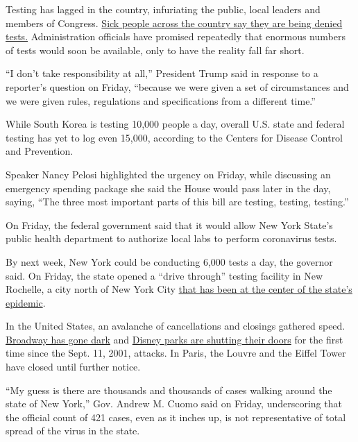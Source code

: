 Testing has lagged in the country, infuriating the public, local leaders
and members of Congress.
\href{https://www.nytimes3xbfgragh.onion/2020/03/12/us/coronavirus-testing-challenges.html}{Sick
people across the country say they are being denied tests.}
Administration officials have promised repeatedly that enormous numbers
of tests would soon be available, only to have the reality fall far
short.

``I don't take responsibility at all,'' President Trump said in response
to a reporter's question on Friday, ``because we were given a set of
circumstances and we were given rules, regulations and specifications
from a different time.''

While South Korea is testing 10,000 people a day, overall U.S. state and
federal testing has yet to log even 15,000, according to the Centers for
Disease Control and Prevention.

Speaker Nancy Pelosi highlighted the urgency on Friday, while discussing
an emergency spending package she said the House would pass later in the
day, saying, ``The three most important parts of this bill are testing,
testing, testing.''

On Friday, the federal government said that it would allow New York
State's public health department to authorize local labs to perform
coronavirus tests.

By next week, New York could be conducting 6,000 tests a day, the
governor said. On Friday, the state opened a ``drive through'' testing
facility in New Rochelle, a city north of New York City
\href{https://www.nytimes3xbfgragh.onion/2020/03/12/nyregion/coronavirus-new-rochelle-containment.html}{that
has been at the center of the state's epidemic}.

In the United States, an avalanche of cancellations and closings
gathered speed.
\href{https://www.nytimes3xbfgragh.onion/2020/03/12/theater/coronavirus-broadway-shutdown.html}{Broadway
has gone dark} and
\href{https://www.nytimes3xbfgragh.onion/2020/03/12/business/disneyland-coronavirus.html}{Disney
parks are shutting their doors} for the first time since the Sept. 11,
2001, attacks. In Paris, the Louvre and the Eiffel Tower have closed
until further notice.

``My guess is there are thousands and thousands of cases walking around
the state of New York,'' Gov. Andrew M. Cuomo said on Friday,
underscoring that the official count of 421 cases, even as it inches up,
is not representative of total spread of the virus in the state.

